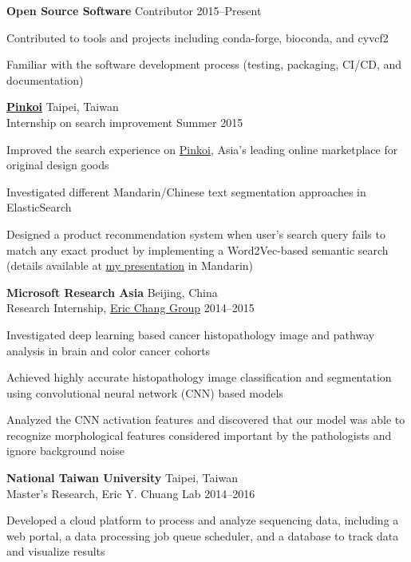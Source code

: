 \begin{entrylist}
\item \textbf{Open Source Software}
Contributor \hfill 2015--Present
\begin{detaillist}
    \item Contributed to tools and projects including conda-forge, bioconda, and cyvcf2
    \item Familiar with the software development process (testing, packaging, CI/CD, and documentation)
\end{detaillist}

\item \href{http://pinkoi.com}{\textbf{Pinkoi}} \hfill Taipei, Taiwan\\
Internship on search improvement \hfill
Summer 2015
\begin{detaillist}
    \item Improved the search experience on \href{http://pinkoi.com}{Pinkoi}, Asia's leading online marketplace for original design goods
    \item Investigated different Mandarin/Chinese text segmentation approaches in ElasticSearch
    \item Designed a product recommendation system when user's search query fails to match any exact product by implementing a Word2Vec-based semantic search (details available at \href{https://blog.liang2.tw/2015Talk-Chinese-Search/}{my presentation} in Mandarin)
\end{detaillist}

\item \textbf{Microsoft Research Asia} \hfill Beijing, China\\
Research Internship, \href{https://www.microsoft.com/en-us/research/people/echang/}{Eric Chang Group} \hfill
2014--2015
\begin{detaillist}
    \item Investigated deep learning based cancer histopathology image and pathway analysis in brain and color cancer cohorts
    \item Achieved highly accurate histopathology image classification and segmentation using convolutional neural network (CNN) based models
    \item Analyzed the CNN activation features and discovered that our model was able to recognize morphological features considered important by the pathologists and ignore background noise
\end{detaillist}

\item \textbf{National Taiwan University} \hfill Taipei, Taiwan\\
Master's Research, Eric Y. Chuang Lab \hfill
2014--2016
\begin{detaillist}
    \item Developed a cloud platform to process and analyze sequencing data, including a web portal, a data processing job queue scheduler, and a database to track data and visualize results
\end{detaillist}


\end{entrylist}
